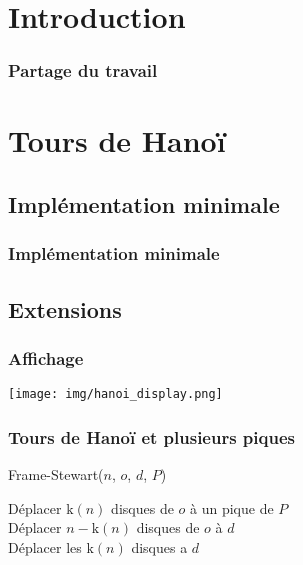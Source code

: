 \documentclass{beamer}
\begin{document}
\section{Introduction}

\begin{frame}
  \frametitle{Partage du travail}

\end{frame}

\section{Tours de Hanoï}

\subsection{Implémentation minimale}

\begin{frame}
  \frametitle{Implémentation minimale}

\end{frame}

\subsection{Extensions}

\begin{frame}
  \frametitle{Affichage}
  \texttt{[image: img/hanoi\_display.png]}
\end{frame}

\begin{frame}
  \begin{center}
  \end{center}
\end{frame}

\begin{frame}
  \frametitle{Tours de Hanoï et plusieurs piques}
  \begin{algorithm}[H]
    \caption{Frame-Stewart($n$, $o$, $d$, $P$)}
    Déplacer $\mathrm{k}(n)$ disques de $o$ à un pique de $P$ \\
    Déplacer $n - \mathrm{k}(n)$ disques de $o$ à $d$ \\
    Déplacer les $\mathrm{k}(n)$ disques a $d$
  \end{algorithm}
\end{frame}
\end{document}
